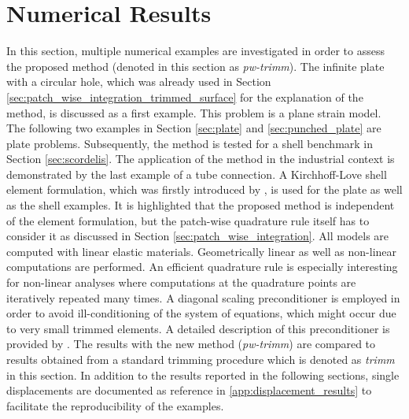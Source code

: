 \documentclass[3p]{elsarticle}
\begin{document}
\section{Numerical Results}\label{sec:numerical_results}
In this section, multiple numerical examples are investigated in order to assess the proposed method (denoted in this section as \textit{pw-trimm}). The infinite plate with a circular hole, which was already used in Section \ref{sec:patch_wise_integration_trimmed_surface} for the explanation of the method, is discussed as a first example. This problem is a plane strain model. The following two examples in Section \ref{sec:plate} and \ref{sec:punched_plate} are plate problems. Subsequently, the method is tested for a shell benchmark in Section \ref{sec:scordelis}. The application of the method in the industrial context is demonstrated by the last example of a tube connection. A Kirchhoff-Love shell element formulation, which was firstly introduced by \cite{Kiendl2011}, is used for the plate as well as the shell examples. It is highlighted that the proposed method is independent of the element formulation, but the patch-wise quadrature rule itself has to consider it as discussed in Section \ref{sec:patch_wise_integration}. All models are computed with linear elastic materials. Geometrically linear as well as non-linear computations are performed. An efficient quadrature rule is especially interesting for non-linear analyses where computations at the quadrature points are iteratively repeated many times. A diagonal scaling preconditioner is employed in order to avoid ill-conditioning of the system of equations, which might occur due to very small trimmed elements. A detailed description of this preconditioner is provided by \cite{Antolin2019}. The results with the new method (\textit{pw-trimm}) are compared to results obtained from a standard trimming procedure which is denoted as \textit{trimm} in this section. In addition to the results reported in the following sections, single displacements are documented as reference in \ref{app:displacement_results} to facilitate the reproducibility of the examples.
\end{document}
